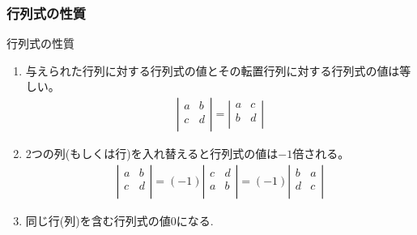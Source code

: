 \documentclass[a4paper]{jsarticle}
\begin{document}
\subsubsection{行列式の性質}
\begin{itembox}[l]{行列式の性質}
    \begin{enumerate}[(1)]
        \item 与えられた行列に対する行列式の値とその転置行列に対する行列式の値は等しい。
              \begin{eqnarray*}
                  \left| \begin{array}{rr}
                      a & b \\
                      c & d \\
                  \end{array} \right|
                  =
                  \left| \begin{array}{rr}
                      a & c \\
                      b & d \\
                  \end{array} \right|
              \end{eqnarray*}
        \item 2つの列(もしくは行)を入れ替えると行列式の値は$-1$倍される。
              \begin{eqnarray*}
                  \left| \begin{array}{rr}
                      a & b \\
                      c & d \\
                  \end{array} \right|
                  =(-1)
                  \left| \begin{array}{rr}
                      c & d \\
                      a & b \\
                  \end{array} \right|
                  =(-1)
                  \left| \begin{array}{rr}
                      b & a \\
                      d & c \\
                  \end{array} \right|
              \end{eqnarray*}
        \item 同じ行(列)を含む行列式の値$0$になる.
              \begin{eqnarray*}

\end{eqnarray*}
\end{enumerate}
\end{itembox}
\end{document}
